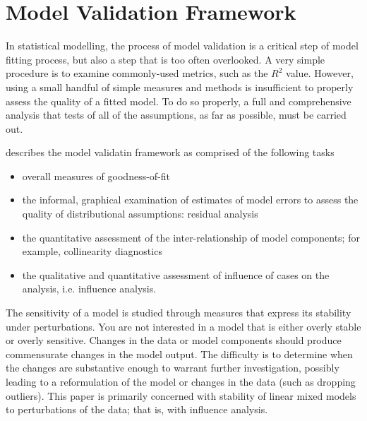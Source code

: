 \documentclass[12pt, a4paper]{article}
\begin{document}
\section{Model Validation Framework}
In statistical modelling, the process of model validation is a critical step of model fitting process, but also a step that is too often overlooked. A very simple procedure is to examine commonly-used
metrics, such as the $R^2$ value. However, using a small handful of simple measures and methods is insufficient to properly assess the quality of a fitted model. To do so properly, a full and comprehensive
analysis that tests of all of the assumptions, as far as possible, must be carried out.

\citet{schab} describes the model validatin framework as comprised of the following tasks

\begin{itemize}
	\item  overall measures of goodness-of-fit
	\item the informal, graphical examination of estimates of model errors to assess the quality of distributional
	assumptions: residual analysis
	
	
	\item the quantitative assessment of the inter-relationship of model components; for example, collinearity 	diagnostics
	\item the qualitative and quantitative assessment of influence of cases on the analysis, i.e. influence analysis.
\end{itemize}

The sensitivity of a model is studied through measures that express its stability under perturbations. You
are not interested in a model that is either overly stable or overly sensitive. Changes in the data or model
components should produce commensurate changes in the model output. The difficulty is to determine
when the changes are substantive enough to warrant further investigation, possibly leading to a reformulation
of the model or changes in the data (such as dropping outliers). This paper is primarily concerned
with stability of linear mixed models to perturbations of the data; that is, with influence analysis. 
\newpage
\end{document}
